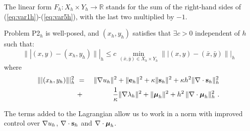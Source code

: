 The linear form $F_h:X_h\times Y_h \to \mathbb{R}$ stands for the sum of the right-hand sides of (\ref{eq:var1h})-(\ref{eq:var5h}), with the last two multiplied by $-1$.

\begin{theorem}
	Problem P2$_h$ is well-posed, and $(x_h,y_h)$ satisfies that $\exists c>0$ independent of $h$ such that:
	\begin{equation}
		\||(x,y)-(x_h,y_h)\||_h \leq c\,\min_{(\bar{x},\bar{y})\in X_h\times Y_h}
		\||(x,y)-(\bar{x},\bar{y})\||_h
		\label{eq:bestapprox}
	\end{equation}
	where
	\begin{eqnarray}
		\||(x_h,y_h)\||_h^2 ~&=&~ \|\nabla u_h \|^2 +\|\mathbf{e}_h\|^2 + \kappa \|\mathbf{s}_h\|^2 + \kappa h^2 \|\nabla \cdot \mathbf{s}_h\|_h^2 \nonumber \\
		~&+&~ \frac{1}{\kappa} \|\nabla \lambda_h\|^2 + \|\boldsymbol{\mu}_h\|^2 + h^2\,\|\nabla \cdot \boldsymbol{\mu}_h\|^2_h~.
	\end{eqnarray}
\end{theorem}

The terms added to the Lagrangian allow us to work in a norm with improved control over $\nabla u_h$, $\nabla \cdot \mathbf{s}_h$ and $\nabla \cdot \boldsymbol{\mu}_h$.

